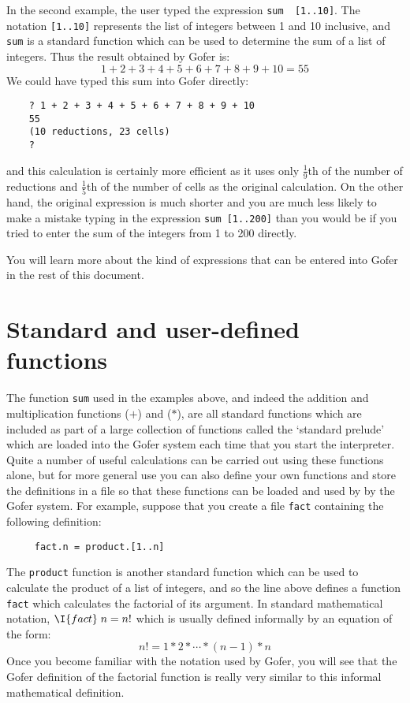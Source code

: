 In the second example, the user typed  the  expression  \verb"sum  [1..10]".
The notation \verb"[1..10]" represents the list of integers between 1 and 10
inclusive, and \verb"sum" is a  standard  function  which  can  be  used  to
determine the sum of a list of integers.  Thus the result  obtained  by
Gofer is:
\[
          1 + 2 + 3 + 4 + 5 + 6 + 7 + 8 + 9 + 10  =  55
\]
We could have typed this sum into Gofer directly:
\begin{verbatim}
    ? 1 + 2 + 3 + 4 + 5 + 6 + 7 + 8 + 9 + 10
    55
    (10 reductions, 23 cells)
    ? 
\end{verbatim}
and this calculation is certainly more efficient as it uses only
$\frac{1}{9}$th of the number of reductions and 
$\frac{1}{5}$th of the number  of  cells  as  the
original calculation.  On the other hand, the  original  expression  is
much shorter and you are much less likely to make a mistake  typing  in
the expression \verb"sum [1..200]" than you would be if you tried  to  enter
the sum of the integers from 1 to 200 directly.

You will learn more about the kind of expressions that can  be  entered
into Gofer in the rest of this document.


\chapter{Standard and user-defined functions}

The function \verb"sum" used in the examples above, and indeed the  addition
and multiplication functions ($+$) and ($*$), are  all  standard  functions
which are included as part of a large collection  of  functions  called
the `standard prelude' which are loaded into the Gofer system each time
that you start the interpreter.  Quite a number of useful  calculations
can be carried out using these functions alone, but  for  more  general
use you can also define your own functions and store the definitions in
a file so that these functions can be loaded and used by by  the  Gofer
system.  For example, suppose that you create a file \verb"fact"  containing
the following definition:
\begin{verbatim}
     fact.n = product.[1..n]
\end{verbatim}
The \verb"product" function is another standard function which can  be  used
to calculate the product of a list of integers, and so the  line  above
defines a  function  \verb"fact"  which  calculates  the  factorial  of  its
argument.  In standard  mathematical notation,  $\I{fact}\; n = n!$   which  is
usually defined informally by an equation of the form:
\[
     n! = 1 * 2 * \cdots * (n-1) * n
\]
Once you become familiar with the notation used by Gofer, you will  see
that the Gofer definition of the  factorial  function  is  really  very
similar to this informal mathematical definition.

